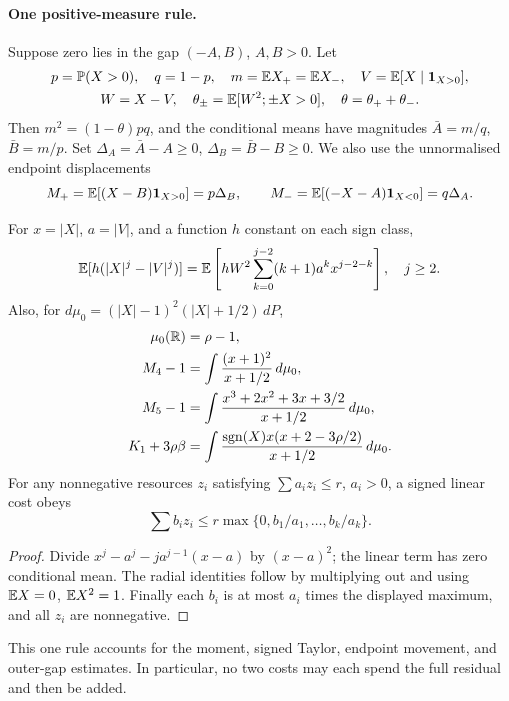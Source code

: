 \paragraph{One positive-measure rule.}
Suppose zero lies in the gap $(-A,B)$, $A,B>0$. Let
\[\begin{gathered}
 p=\mathbb P(X>0),\quad q=1-p,\quad m=\mathbb E X_+=\mathbb E X_-,\quad V=\mathbb E[X\mid\mathbf1_{X>0}],\\
 W=X-V,\quad\theta_\pm=\mathbb E[W^2;\pm X>0],\quad\theta=\theta_++\theta_-.
\end{gathered}\]
Then $m^2=(1-\theta)pq$, and the conditional means have magnitudes
$\bar A=m/q$, $\bar B=m/p$. Set
$\Delta_A=\bar A-A\ge0$, $\Delta_B=\bar B-B\ge0$.
We also use the unnormalised endpoint displacements
\[
 M_+=\mathbb E[(X-B)\mathbf1_{X>0}]=p\Delta_B,\qquad
 M_-=\mathbb E[(-X-A)\mathbf1_{X<0}]=q\Delta_A.
\]

\begin{lemma}\label{j:local:re:pricing}
For $x=|X|$, $a=|V|$, and a function $h$ constant on each sign class,
\begin{equation}\label{j:local:re:conditional}
 \mathbb E[h(|X|^j-|V|^j)]
 =\mathbb E\left[hW^2\sum_{k=0}^{j-2}(k+1)a^kx^{j-2-k}\right],\quad j\ge2.
\end{equation}
Also, for $d\mu_0=(|X|-1)^2(|X|+1/2)\,dP$,
\begin{align*}
 \mu_0(\mathbb R)&=\rho-1,\\
 M_4-1&=\int\frac{(x+1)^2}{x+1/2}\,d\mu_0,\\
 M_5-1&=\int\frac{x^3+2x^2+3x+3/2}{x+1/2}\,d\mu_0,\\
 K_1+3\rho\beta&=\int
  \frac{\operatorname{sgn}(X)x(x+2-3\rho/2)}{x+1/2}\,d\mu_0.
\end{align*}
For any nonnegative resources $z_i$ satisfying $\sum a_i z_i\le r$,
$a_i>0$, a signed linear cost obeys
\begin{equation}\label{j:local:re:simplex}
 \sum b_i z_i\le r\max\{0,b_1/a_1,\ldots,b_k/a_k\}.
\end{equation}
\end{lemma}
\begin{proof}
Divide $x^j-a^j-ja^{j-1}(x-a)$ by $(x-a)^2$; the linear term has
zero conditional mean. The radial identities follow by multiplying
out and using $\mathbb E X=0$, $\mathbb E X^2=1$. Finally each $b_i$ is at most
$a_i$ times the displayed maximum, and all $z_i$ are nonnegative.
\end{proof}

This one rule accounts for the moment, signed Taylor, endpoint movement,
and outer-gap estimates. In particular, no two costs
may each spend the full residual and then be added.



